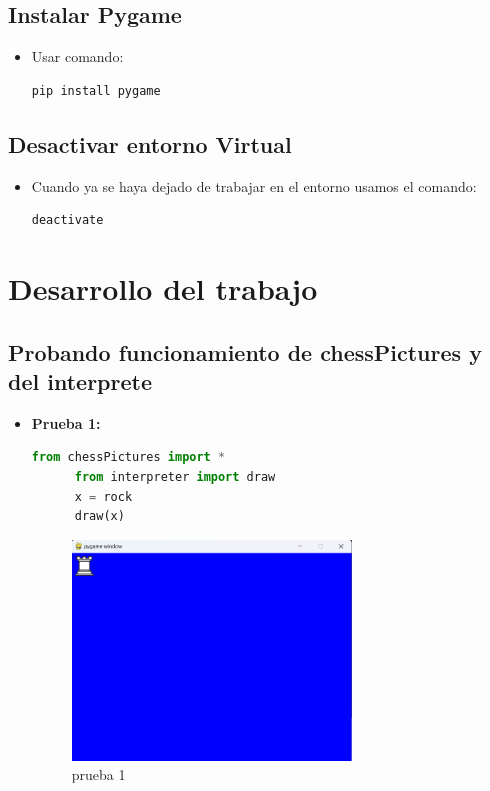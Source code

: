 \documentclass{article}
\begin{document}
  \subsection{Instalar Pygame}
  \begin{itemize}
    \item Usar comando:
    \begin{lstlisting}[language={}]
      pip install pygame
    \end{lstlisting}
  \end{itemize}
  
  
  \subsection{Desactivar entorno Virtual}
  \begin{itemize}
    \item Cuando ya se haya dejado de trabajar en el entorno usamos el comando:
    \begin{lstlisting}[language={}]
      deactivate
    \end{lstlisting}
  \end{itemize}


  \section{Desarrollo del trabajo}


  \subsection{Probando funcionamiento de chessPictures y del interprete}
  \begin{itemize}
    \item \textbf{Prueba 1:}
    \begin{lstlisting}[language=Python, caption=Código de prueba Python]
      from chessPictures import *
      from interpreter import draw
      x = rock
      draw(x)
    \end{lstlisting}
    \begin{figure}[H]
      \centering
      \includegraphics[width=0.7\textwidth, keepaspectratio]{img/prueba1.png}
      \caption{prueba 1}
    \end{figure}
  \end{itemize}
  \newpage
  
\end{document}
